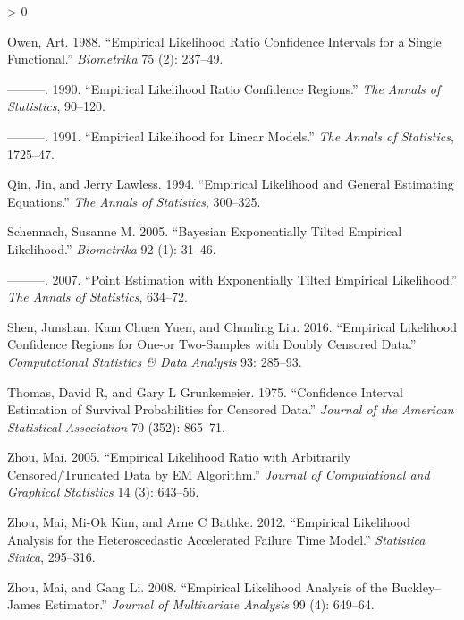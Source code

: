 \documentclass[article]{jss}
\newlength{\cslhangindent}
\newenvironment{CSLReferences}[2] %
 {%
  \setlength{\parindent}{0pt}
  \ifodd #1 \everypar{\setlength{\hangindent}{\cslhangindent}}\ignorespaces\fi
  \ifnum #2 > 0
  \setlength{\parskip}{#2\baselineskip}
  \fi
 }%
 {}
\renewcommand{\|}{\,|\,}
\begin{document}
\begin{CSLReferences}{1}{0}
\leavevmode\hypertarget{ref-owen1988}{}%
Owen, Art. 1988. {``Empirical Likelihood Ratio Confidence Intervals for a Single Functional.''} \emph{Biometrika} 75 (2): 237--49.

\leavevmode\hypertarget{ref-owen1990}{}%
---------. 1990. {``Empirical Likelihood Ratio Confidence Regions.''} \emph{The Annals of Statistics}, 90--120.

\leavevmode\hypertarget{ref-owen1991}{}%
---------. 1991. {``Empirical Likelihood for Linear Models.''} \emph{The Annals of Statistics}, 1725--47.

\leavevmode\hypertarget{ref-qin-lawless1994}{}%
Qin, Jin, and Jerry Lawless. 1994. {``Empirical Likelihood and General Estimating Equations.''} \emph{The Annals of Statistics}, 300--325.

\leavevmode\hypertarget{ref-schennach2005}{}%
Schennach, Susanne M. 2005. {``Bayesian Exponentially Tilted Empirical Likelihood.''} \emph{Biometrika} 92 (1): 31--46.

\leavevmode\hypertarget{ref-schennach2007}{}%
---------. 2007. {``Point Estimation with Exponentially Tilted Empirical Likelihood.''} \emph{The Annals of Statistics}, 634--72.

\leavevmode\hypertarget{ref-shen-et-al2016}{}%
Shen, Junshan, Kam Chuen Yuen, and Chunling Liu. 2016. {``Empirical Likelihood Confidence Regions for One-or Two-Samples with Doubly Censored Data.''} \emph{Computational Statistics \& Data Analysis} 93: 285--93.

\leavevmode\hypertarget{ref-thomas-grunkemeier1975}{}%
Thomas, David R, and Gary L Grunkemeier. 1975. {``Confidence Interval Estimation of Survival Probabilities for Censored Data.''} \emph{Journal of the American Statistical Association} 70 (352): 865--71.

\leavevmode\hypertarget{ref-zhou2005}{}%
Zhou, Mai. 2005. {``Empirical Likelihood Ratio with Arbitrarily Censored/Truncated Data by EM Algorithm.''} \emph{Journal of Computational and Graphical Statistics} 14 (3): 643--56.

\leavevmode\hypertarget{ref-zhou-et-al2012}{}%
Zhou, Mai, Mi-Ok Kim, and Arne C Bathke. 2012. {``Empirical Likelihood Analysis for the Heteroscedastic Accelerated Failure Time Model.''} \emph{Statistica Sinica}, 295--316.

\leavevmode\hypertarget{ref-zhou-li2008}{}%
Zhou, Mai, and Gang Li. 2008. {``Empirical Likelihood Analysis of the Buckley--James Estimator.''} \emph{Journal of Multivariate Analysis} 99 (4): 649--64.

\end{CSLReferences}
\end{document}
